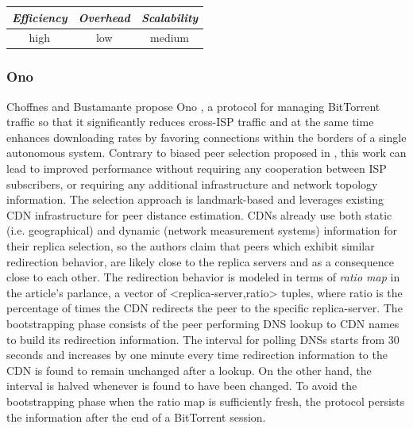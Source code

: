\begin{center}
\begin{tabular}{ccc}
\emph{Efficiency} & \emph{Overhead} & \emph{Scalability} \\
\hline
high &
low &
medium
\end{tabular}
\end{center}

\subsubsection{Ono}
Choffnes and Bustamante propose Ono \cite{CB2008}, a protocol for managing
BitTorrent traffic so that it significantly reduces cross-ISP traffic and at the
same time enhances downloading rates by favoring connections within the borders
of a single autonomous system. Contrary to biased peer selection proposed in
\cite{BCCMSBZ2006}, this work can lead to improved performance without requiring
any cooperation between ISP subscribers, or requiring any additional
infrastructure and network topology information. The selection approach is
landmark-based and leverages existing CDN infrastructure for peer distance
estimation. CDNs already use both static (i.e. geographical) and dynamic
(network measurement systems) information for their replica selection, so the
authors claim that peers which exhibit similar redirection behavior, are 
likely close to the replica servers and as a consequence close to each other.
The redirection behavior is modeled in terms of \emph{ratio map} in the
article's parlance, a vector of <replica-server,ratio> tuples, where ratio is
the percentage of times the CDN redirects the peer to the specific replica-server.
The bootstrapping phase consists of the peer performing DNS lookup to CDN names
to build its redirection information. The interval for polling DNSs
starts from 30 seconds and increases by one minute every time redirection
information to the CDN is found to remain unchanged after a lookup. On the other
hand, the interval is halved whenever is found to have been changed.  
To avoid the bootstrapping phase when the ratio map is sufficiently fresh, the
protocol persists the information after the end of a BitTorrent session.

